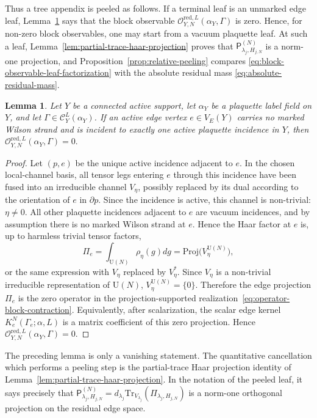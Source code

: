 \documentclass[11pt,a4paper,reqno]{amsart}
\newtheorem{lemma}[theorem]{Lemma}
\theoremstyle{definition}
\theoremstyle{remark}
\newcommand\U{{\mathrm U}}
\newcommand\Tr{{\mathrm{Tr}}}
\newcommand\Proj{{\mathrm{Proj}}}
\begin{document}
Thus a tree appendix is peeled as follows.  If a terminal leaf is an unmarked edge leaf, Lemma~\ref{lem:no-dangling-edge} says that the block observable $\mathcal O_{Y,N}^{\mathrm{red},L}(\alpha_Y,\Gamma)$ is zero.  Hence, for non-zero block observables, one may start from a vacuum plaquette leaf.  At such a leaf, Lemma~\ref{lem:partial-trace-haar-projection} proves that $\mathsf P_{\lambda_j,H_{j,N}}^{(N)}$ is a norm-one projection, and Proposition~\ref{prop:relative-peeling} compares \eqref{eq:block-observable-leaf-factorization} with the absolute residual mass \eqref{eq:absolute-residual-mass}. 

\begin{lemma}
\label{lem:no-dangling-edge}
Let $Y$ be a connected active support, let $\alpha_Y$ be a plaquette label field on $Y$, and let $\Gamma\in\mathcal C_Y^L(\alpha_Y)$.  If an active edge vertex $e\in V_E(Y)$ carries no marked Wilson strand and is incident to exactly one active plaquette incidence in $Y$, then $\mathcal O_{Y,N}^{\mathrm{red},L}(\alpha_Y,\Gamma)=0.$
\end{lemma}

\begin{proof}
Let $(p,e)$ be the unique active incidence adjacent to $e$.  In the chosen local-channel basis, all tensor legs entering $e$ through this incidence have been fused into an irreducible channel $V_\eta$, possibly replaced by its dual according to the orientation of $e$ in $\partial p$.  Since the incidence is active, this channel is non-trivial: $\eta\neq0$.  All other plaquette incidences adjacent to $e$ are vacuum incidences, and by assumption there is no marked Wilson strand at $e$.  Hence the Haar factor at $e$ is, up to harmless trivial tensor factors,
\[
\Pi_e
=
\int_{\U(N)} \rho_\eta(g) dg
=
\Proj\bigl(V_\eta^{\U(N)}\bigr),
\]
or the same expression with $V_\eta$ replaced by $V_\eta^*$.  Since $V_\eta$ is a non-trivial irreducible representation of $\U(N)$, $V_\eta^{\U(N)}=\{0\}$.  Therefore the edge projection $\Pi_e$ is the zero operator in the projection-supported realization~\eqref{eq:operator-block-contraction}.  Equivalently, after scalarization, the scalar edge kernel $K_e^N(\Gamma_e;\alpha,L)$ is a matrix coefficient of this zero projection.  Hence $\mathcal O_{Y,N}^{\mathrm{red},L}(\alpha_Y,\Gamma)=0$.
\end{proof}


The preceding lemma is only a vanishing statement.  The quantitative cancellation which performs a peeling step is the partial-trace Haar projection identity of Lemma~\ref{lem:partial-trace-haar-projection}.  In the notation of the peeled leaf, it says precisely that $\mathsf P_{\lambda_j,H_{j,N}}^{(N)}=d_{\lambda_j}\Tr_{V_{\lambda_j}}(\Pi_{\lambda_j,H_{j,N}})$ is a norm-one orthogonal projection on the residual edge space.
\end{document}
